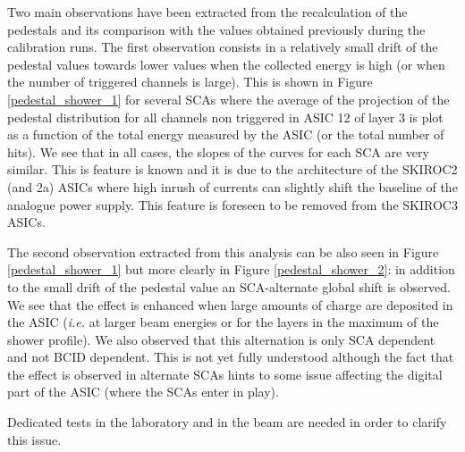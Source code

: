 \documentclass[a4paper,11pt]{article}
\begin{document}
Two main observations have been extracted from the recalculation of the pedestals and its comparison
with the values obtained previously during the calibration runs. The first observation
consists in a relatively small 
drift of the pedestal values
towards lower values when the collected energy is high (or when the number of triggered channels is large).
This is shown in Figure \ref{pedestal_shower_1} for several SCAs where the
average of the projection of the pedestal distribution for all channels non triggered in ASIC 12 of layer 3 
is plot as a function of the total energy measured by the ASIC (or the total number of hits).
We see that in all cases, the slopes of the curves 
for each SCA are very similar.
This is feature is known and it is due to the architecture of the SKIROC2 (and 2a) ASICs 
where high inrush of currents can slightly shift the baseline of the analogue power supply. 
This feature is foreseen to be removed from the SKIROC3 ASICs. 

The second observation extracted from this analysis can be also seen in Figure \ref{pedestal_shower_1} but
more clearly in Figure \ref{pedestal_shower_2}: in addition
to the small drift of the pedestal value an SCA-alternate global shift
is observed. We see that the effect is enhanced when large amounts of charge
are deposited in the ASIC ({\it i.e.} at larger beam energies or for the layers in the maximum of the shower
profile). We also observed that this alternation is only SCA dependent and not BCID dependent.
This is not yet fully understood although the fact that the effect is observed in
alternate SCAs hints to some issue affecting the digital part of the ASIC 
(where the SCAs enter in play). 

Dedicated tests in the laboratory and in the beam are needed in order to clarify this issue.
\end{document}
